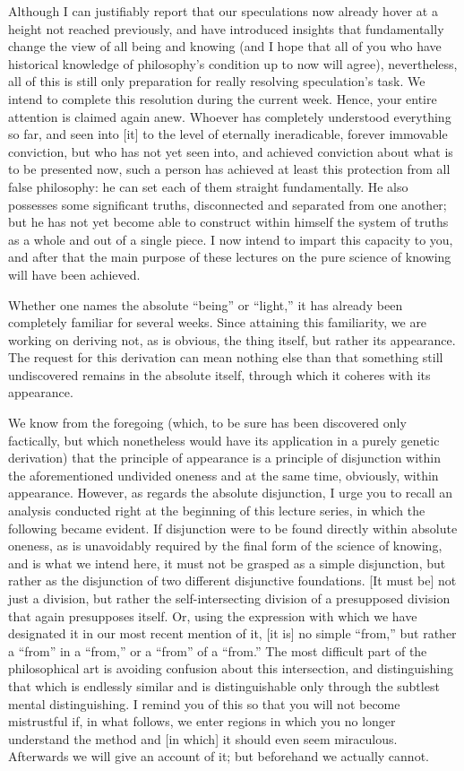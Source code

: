 Although I can justifiably report that
our speculations now already hover at
a height not reached previously,
and have introduced insights
that fundamentally change the view
of all being and knowing
(and I hope that all of you who have historical knowledge of
philosophy's condition up to now will agree),
nevertheless, all of this is still only preparation
for really resolving speculation's task.
We intend to complete this resolution during the current week.
Hence, your entire attention is claimed again anew.
Whoever has completely understood everything so far,
and seen into [it] to the level of
eternally ineradicable, forever immovable conviction,
but who has not yet seen into,
and achieved conviction about
what is to be presented now,
such a person has achieved at least
this protection from all false philosophy:
he can set each of them straight fundamentally.
He also possesses some significant truths,
disconnected and separated from one another;
but he has not yet become able to construct
within himself the system of truths
as a whole and out of a single piece.
I now intend to impart this capacity to you,
and after that the main purpose of these lectures
on the pure science of knowing will have been achieved.

Whether one names the absolute “being” or “light,”
it has already been completely familiar for several weeks.
Since attaining this familiarity, we are working on
deriving not, as is obvious, the thing itself,
but rather its appearance.
The request for this derivation can mean nothing else than
that something still undiscovered remains in the absolute itself,
through which it coheres with its appearance.

We know from the foregoing
(which, to be sure has been discovered only factically,
but which nonetheless would have its application
in a purely genetic derivation)
that the principle of appearance is
a principle of disjunction
within the aforementioned undivided oneness
and at the same time, obviously, within appearance.
However, as regards the absolute disjunction,
I urge you to recall an analysis conducted right at
the beginning of this lecture series,
in which the following became evident.
If disjunction were to be found
directly within absolute oneness,
as is unavoidably required by
the final form of the science of knowing,
and is what we intend here,
it must not be grasped as a simple disjunction,
but rather as the disjunction of
two different disjunctive foundations.
[It must be] not just a division,
but rather the self-intersecting division
of a presupposed division that again presupposes itself.
Or, using the expression with which we have designated it
in our most recent mention of it,
[it is] no simple “from,”
but rather a “from” in a “from,”
or a “from” of a “from.”
The most difficult part of the philosophical art is
avoiding confusion about this intersection,
and distinguishing that which is endlessly similar
and is distinguishable only through the subtlest mental distinguishing.
I remind you of this so that you will not become mistrustful
if, in what follows, we enter regions
in which you no longer understand the method
and [in which] it should even seem miraculous.
Afterwards we will give an account of it;
but beforehand we actually cannot.

